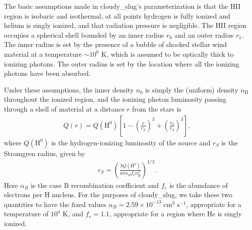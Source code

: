 \documentclass[letterpaper,10pt,english]{sphinxmanual}
\begin{document}
The basic assumptions made in cloudy\_slug’s parameterization is
that the HII region is isobaric and isothermal, at all points hydrogen
is fully ionized and helium is singly ionized, and that radiation
pressure is negligible. The HII region occupies a spherical shell
bounded by an inner radius \(r_0\) and an outer radius
\(r_1\). The inner radius is set by the presence of a bubble of
shocked stellar wind material at a temperature \(\sim 10^6\) K,
which is assumed to be optically thick to ionizing photons. The
outer radius is set by the location where all the ionizing photons
have been absorbed.

Under these assumptions, the inner density \(n_0\) is simply the
(uniform) density \(n_{\mathrm{II}}\) throughout the ionized
region, and the ionizing photon luminosity passing through a shell of
material at a distance \(r\) from the stars is
\begin{equation*}
\begin{split}Q(r) = Q(\mathrm{H}^0)
\left[1 - \left(\frac{r}{r_S}\right)^3 +
\left(\frac{r_0}{r_S}\right)^3\right],\end{split}
\end{equation*}
where \(Q(\mathrm{H}^0)\) is the hydrogen-ionizing luminosity of
the source and \(r_S\) is the Stromgren radius, given by
\begin{equation*}
\begin{split}r_S = \left(\frac{3 Q(\mathrm{H}^0)}{4\pi
\alpha_B f_e n_{\mathrm{II}}^2}\right)^{1/3}.\end{split}
\end{equation*}
Here \(\alpha_B\) is the case B recombination coefficient and
\(f_e\) is the abundance of electrons per H nucleus. For the
purposes of cloudy\_slug, we take these two quantities to have
the fixed values \(\alpha_B = 2.59\times
10^{-13}\;\mathrm{cm}^3\;\mathrm{s}^{-1}\), appropriate for a
temperature of \(10^4\) K, and \(f_e = 1.1\), appropriate for
a region where He is singly ionized.
\end{document}
